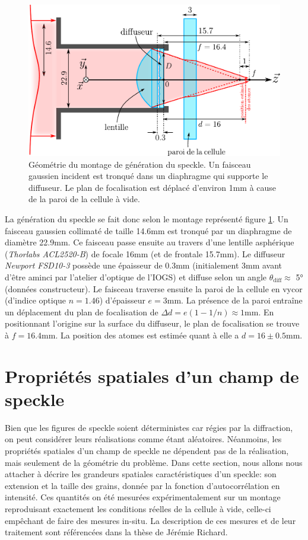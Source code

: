 \begin{figure}
\centering
\includegraphics[scale=0.7]{Fig/Speckle/montage_diffuseur.pdf}
\caption{Géométrie du montage de génération du speckle. Un faisceau gaussien incident est tronqué dans un diaphragme qui supporte le diffuseur. Le plan de focalisation est déplacé d'environ 1mm à cause de la paroi de la cellule à vide.}
\label{fig:montage_diffuseur}
\end{figure}

La génération du speckle se fait donc selon le montage représenté figure \ref{fig:montage_diffuseur}. Un faisceau gaussien collimaté de taille 14.6mm est tronqué par un diaphragme de diamètre 22.9mm. Ce faisceau passe ensuite au travers d'une lentille asphérique (\textit{Thorlabs ACL2520-B}) de focale 16mm (et de frontale 15.7mm). Le diffuseur \textit{Newport FSD10-3} possède une épaisseur de 0.3mm (initialement 3mm avant d'être aminci par l'atelier d'optique de l'IOGS) et diffuse selon un angle $\theta_{\mathrm{diff}}\approx$ 5° (données constructeur). Le faisceau traverse ensuite la paroi de la cellule en vycor (d'indice optique $n=1.46$) d'épaisseur $e=3$mm. La présence de la paroi entraîne un déplacement du plan de focalisation de $\Delta d=e(1-1/n)\approx1$mm. En positionnant l'origine sur la surface du diffuseur, le plan de focalisation se trouve à $f=16.4$mm. La position des atomes est estimée quant à elle a $d=16\pm0.5$mm.



\section{Propriétés spatiales d'un champ de speckle}
Bien que les figures de speckle soient déterministes car régies par la diffraction, on peut considérer leurs réalisations comme étant aléatoires. Néanmoins, les propriétés spatiales d'un champ de speckle ne dépendent pas de la réalisation, mais seulement de la géométrie du problème. Dans cette section, nous allons nous attacher à décrire les grandeurs spatiales caractéristiques d'un speckle: son extension et la taille des grains, donnée par la fonction d'autocorrélation en intensité. Ces quantités on été mesurées expérimentalement sur un montage reproduisant exactement les conditions réelles de la cellule à vide, celle-ci empêchant de faire des mesures in-situ. La description de ces mesures et de leur traitement sont référencées dans la thèse de Jérémie Richard.

